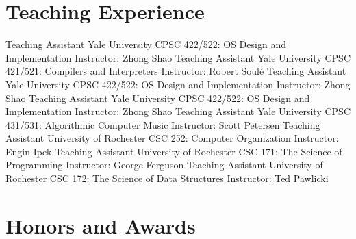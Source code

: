 \documentclass[10pt,letterpaper,sans]{moderncv}
\begin{document}
\section{Teaching Experience}

        {Teaching Assistant}
        {Yale University}
        {CPSC 422/522: OS Design and Implementation}
        {}
        {Instructor: Zhong Shao}
        {Teaching Assistant}
        {Yale University}
        {CPSC 421/521: Compilers and Interpreters}
        {}
        {Instructor: Robert Soul{\'e}}
        {Teaching Assistant}
        {Yale University}
        {CPSC 422/522: OS Design and Implementation}
        {}
        {Instructor: Zhong Shao}
        {Teaching Assistant}
        {Yale University}
        {CPSC 422/522: OS Design and Implementation}
        {}
        {Instructor: Zhong Shao}
        {Teaching Assistant}
        {Yale University}
        {CPSC 431/531: Algorithmic Computer Music}
        {}
        {Instructor: Scott Petersen}
        {Teaching Assistant}
        {University of Rochester}
        {CSC 252: Computer Organization}
        {}
        {Instructor: Engin Ipek}
        {Teaching Assistant}
        {University of Rochester}
        {CSC 171: The Science of Programming}
        {}
        {Instructor: George Ferguson}
        {Teaching Assistant}
        {University of Rochester}
        {CSC 172: The Science of Data Structures}
        {}
        {Instructor: Ted Pawlicki}

\section{Honors and Awards}


\nocite{*}


\end{document}
